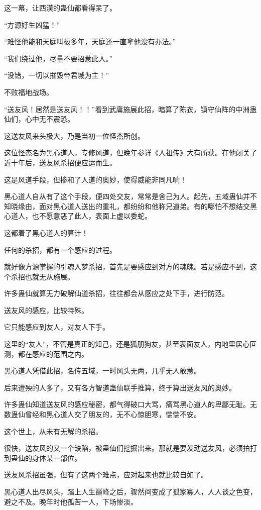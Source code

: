 \begin{this_body}
这一幕，让西漠的蛊仙都看得呆了。

“方源好生凶猛！”

“难怪他能和天庭叫板多年，天庭还一直拿他没有办法。”

“我们绕过他，尽量不要招惹此人。”

“没错，一切以摧毁帝君城为主！”

不败福地战场。

“送友风！居然是送友风！！”看到武庸施展此招，暗算了陈衣，镇守仙阵的中洲蛊仙们，心中无不震恐。

这送友风来头极大，乃是当初一位怪杰所创。

这位怪杰名为黑心道人，专修风道，但晚年参详《人祖传》大有所获。在他闭关了近十年后，送友风杀招便应运而生。

这是风道手段，但掺和了人道的奥妙，使得威能非同凡响！

黑心道人自从有了这个手段，便四处交友，常常是舍己为人。起先，五域蛊仙并不知晓缘由，面对黑心道人送出的重礼，都纷纷和他称兄道弟。有的哪怕不想结交黑心道人，也不愿意恶了此人，表面上虚以委蛇。

这都着了黑心道人的算计！

任何的杀招，都有一个感应的过程。

就好像方源掌握的引魂入梦杀招，首先是要感应到对方的魂魄。若是感应不到，这个杀招也就无从施展。

许多蛊仙就算无力破解仙道杀招，往往都会从感应之处下手，进行防范。

送友风的感应，比较特殊。

它只能感应到友人，对友人下手。

这里的“友人”，不管是真正的知己，还是狐朋狗友，甚至表面友人，内地里居心叵测，都在感应的范围之内。

黑心道人凭借此招，名传五域，一时风头无两，几乎无人敢惹。

后来遭殃的人多了，又有各方智道蛊仙联手推算，终于算出送友风的奥妙。

许多蛊仙知道送友风的感应秘密，都气得破口大骂，痛骂黑心道人的卑鄙无耻。无数蛊仙曾经和黑心道人交了朋友的，无不心惊胆寒，惴惴不安。

这个世上，从未有无解的杀招。

很快，送友风的又一个缺陷，被蛊仙们挖掘出来。那就是要发动送友风，必须拍打到蛊仙的身体某一部位。

送友风杀招虽强，但有了这两个难点，应对起来也就比较自如了。

黑心道人出尽风头，踏上人生巅峰之后，骤然间变成了孤家寡人，人人谈之色变，避之不及。晚年时他孤苦一人，下场惨淡。


\end{this_body}
